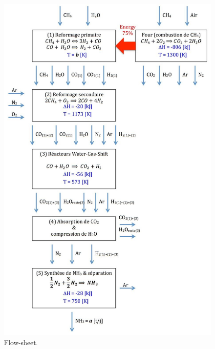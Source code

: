 \begin{figure}[ht!]
	\centering
	\includegraphics[scale=0.6]{media/flow-sheet-v2.jpg}
	\caption{Flow-sheet.}
	\label{fig:flow-sheet}
\end{figure}

